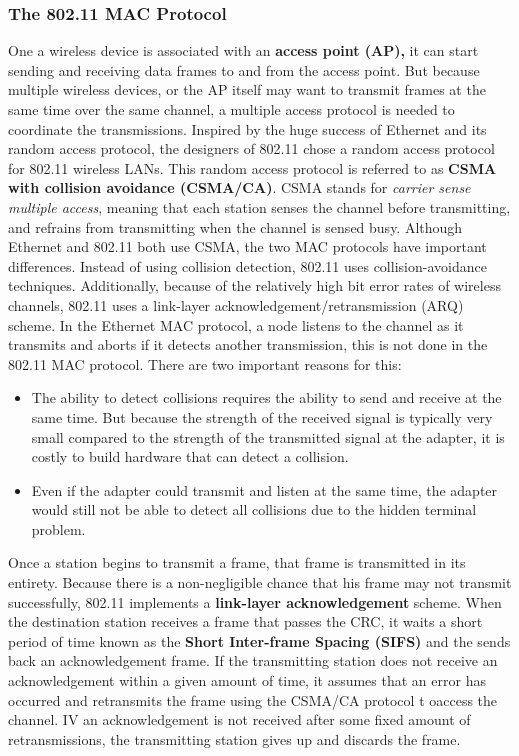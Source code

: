 \subsubsection{The 802.11 MAC Protocol}
One a wireless device is associated with an \textbf{access point (AP),} it can start sending and receiving data frames to and from the access point. But because multiple wireless devices, or the AP itself may want to transmit frames at the same time over the same channel, a multiple access protocol is needed to coordinate the transmissions. Inspired by the huge success of Ethernet and its random access protocol, the designers of 802.11 chose a random access protocol for 802.11 wireless LANs. This random access protocol is referred to as \textbf{CSMA with collision avoidance (CSMA/CA)}. CSMA stands for \textit{carrier sense multiple access}, meaning that each station senses the channel before transmitting, and refrains from transmitting when the channel is sensed busy. Although Ethernet and 802.11 both use CSMA, the two MAC protocols have important differences. Instead of using collision detection, 802.11 uses collision-avoidance techniques. Additionally, because of the relatively high bit error rates of wireless channels, 802.11 uses a link-layer acknowledgement/retransmission (ARQ) scheme. In the Ethernet MAC protocol, a node listens to the channel as it transmits and aborts if it detects another transmission, this is not done in the 802.11 MAC protocol. There are two important reasons for this:
\begin{itemize}
\item The ability to detect collisions requires the ability to send and receive at the same time. But because the strength of the received signal is typically very small compared to the strength of the transmitted signal at the adapter, it is costly to build hardware that can detect a collision.
\item Even if the adapter could transmit and listen at the same time, the adapter would still not be able to detect all collisions due to the hidden terminal problem.
\end{itemize}
Once a station begins to transmit a frame, that frame is transmitted in its entirety. Because there is a non-negligible chance that his frame may not transmit successfully, 802.11 implements a \textbf{link-layer acknowledgement} scheme. When the destination station receives a frame that passes the CRC, it waits a short period of time known as the \textbf{Short Inter-frame Spacing (SIFS)} and the sends back an acknowledgement frame. If the transmitting station does not receive an acknowledgement within a given amount of time, it assumes that an error has occurred and retransmits the frame using the CSMA/CA protocol t oaccess the channel. IV an acknowledgement is not received after some fixed amount of retransmissions, the transmitting station gives up and discards the frame. \vspace{.3cm}\\

